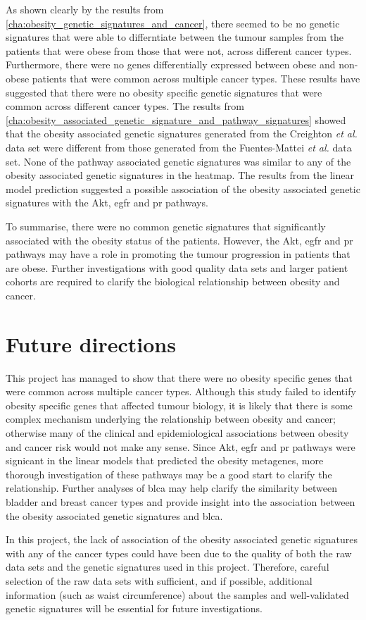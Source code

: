 As shown clearly by the results from \cref{cha:obesity_genetic_signatures_and_cancer}, there seemed to be no  genetic signatures that were able to differntiate between the tumour samples from the patients that were obese from those that were not, across different cancer types.
Furthermore, there were no genes differentially expressed between obese and non-obese patients that were common across multiple cancer types.
These results have suggested that there were no obesity specific genetic signatures that were common across different cancer types.
The results from \cref{cha:obesity_associated_genetic_signature_and_pathway_signatures} showed that the obesity associated genetic signatures generated from the Creighton \textit{et al.} data set were different from those generated from the Fuentes-Mattei \textit{et al.} data set.
None of the pathway associated genetic signatures was similar to any of the obesity associated genetic signatures in the heatmap.
The results from the linear model prediction suggested a possible association of the obesity associated genetic signatures with the Akt, \gls{egfr} and \gls{pr} pathways.

To summarise, there were no common genetic signatures that significantly associated with the obesity status of the patients.
However, the Akt, \gls{egfr} and \gls{pr} pathways may have a role in promoting the tumour progression in patients that are obese.
Further investigations with good quality data sets and larger patient cohorts are required to clarify the biological relationship between obesity and cancer.

\section{Future directions}
\label{sec:future_directions}

This project has managed to show that there were no obesity specific genes  that were common across multiple cancer types.
Although this study failed to identify obesity specific genes that affected tumour biology, it is likely that there is some complex mechanism underlying the relationship between obesity and cancer; otherwise many of the clinical and epidemiological associations between obesity and cancer risk would not make any sense.
Since Akt, \gls{egfr} and \gls{pr} pathways were signicant in the linear models that predicted the obesity metagenes, more thorough investigation of these pathways may be a good start to clarify the relationship.
Further analyses of \gls{blca} may help clarify the similarity between bladder and breast cancer types and provide insight into the association between the obesity associated genetic signatures and \gls{blca}.

In this project, the lack of association of the obesity associated genetic signatures with any of the cancer types could have been due to the quality of both the raw data sets and the genetic signatures used in this project.
Therefore, careful selection of the raw data sets with sufficient, and if possible, additional information (such as waist circumference) about the samples and well-validated genetic signatures will be essential for future investigations.

